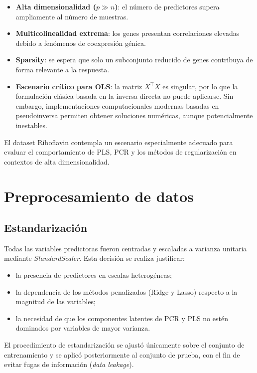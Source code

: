 \documentclass[12pt,a4paper]{report}
\begin{document}
\begin{itemize}
    \item \textbf{Alta dimensionalidad ($p \gg n$)}: el número de predictores supera 
    ampliamente al número de muestras.

    \item \textbf{Multicolinealidad extrema}: los genes presentan correlaciones elevadas debido a fenómenos de coexpresión génica.

    \item \textbf{Sparsity}: se espera que solo un subconjunto reducido de genes contribuya de forma relevante a la respuesta.

    \item \textbf{Escenario crítico para OLS}: la matriz $X^\top X$ es singular, por lo que la formulación clásica basada en la inversa directa no puede aplicarse. Sin embargo, implementaciones computacionales modernas basadas en pseudoinversa permiten obtener soluciones numéricas, aunque potencialmente inestables.
\end{itemize}

El dataset Riboflavin contempla un escenario especialmente adecuado para evaluar el comportamiento de PLS, PCR y los métodos de regularización en contextos de alta dimensionalidad.

\section{Preprocesamiento de datos}

\subsection{Estandarización}

Todas las variables predictoras fueron centradas y escaladas a varianza unitaria mediante \textit{StandardScaler}. Esta decisión se realiza justificar:

\begin{itemize}
    \item la presencia de predictores en escalas heterogéneas;
    \item la dependencia de los métodos penalizados (Ridge y Lasso) respecto a la magnitud de las variables;
    \item la necesidad de que los componentes latentes de PCR y PLS no estén dominados por variables de mayor varianza.
\end{itemize}

El procedimiento de estandarización se ajustó únicamente sobre el conjunto de entrenamiento y se aplicó posteriormente al conjunto de prueba, con el fin de evitar fugas de información (\textit{data leakage}).
\end{document}
